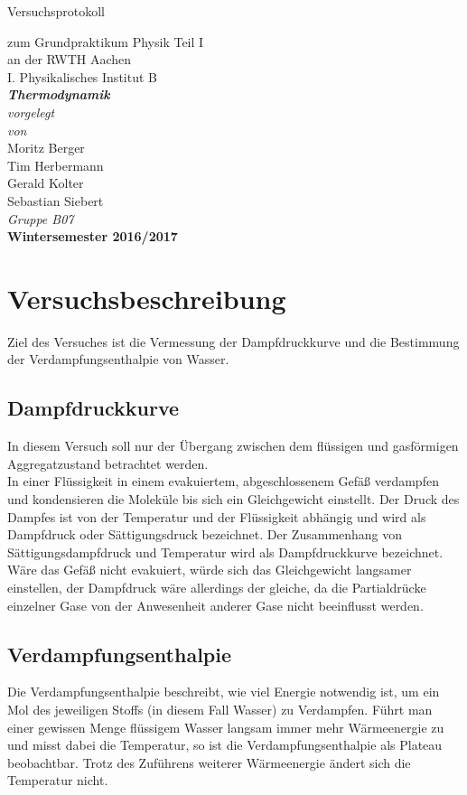\documentclass[12pt,a4paper]{article}
\author{Tim}
\begin{document}
\setlength{\parindent}{0pt} 
\begin{center}
{\LARGE Versuchsprotokoll}\\
\begin{large}
zum Grundpraktikum Physik Teil I\\[0.4cm]
an der RWTH Aachen\\
I. Physikalisches Institut B\\[4.5cm]
\Large\textbf{\textsl{Thermodynamik}}\\[4cm]
\normalsize\textit{vorgelegt\\von}\\[0.4cm]
\large{Moritz Berger\\Tim Herbermann\\Gerald Kolter\\Sebastian Siebert}\\[1cm]
\large \textit{Gruppe B07} \\ [3cm]
\large \textbf{Wintersemester 2016/2017}
\end{large}
\end{center}
\newpage
\tableofcontents
\newpage

\section{Versuchsbeschreibung}
Ziel des Versuches ist die Vermessung der Dampfdruckkurve und die Bestimmung der Verdampfungsenthalpie von Wasser.\\

\subsection{Dampfdruckkurve}
In diesem Versuch soll nur der Übergang zwischen dem flüssigen und gasförmigen Aggregatzustand betrachtet werden. \\
In einer Flüssigkeit in einem evakuiertem, abgeschlossenem Gefäß verdampfen und kondensieren die Moleküle bis sich ein Gleichgewicht einstellt. Der Druck des Dampfes ist von der Temperatur und der Flüssigkeit abhängig und wird als Dampfdruck oder Sättigungsdruck bezeichnet. Der Zusammenhang von Sättigungsdampfdruck und Temperatur wird als Dampfdruckkurve bezeichnet. Wäre das Gefäß nicht evakuiert, würde sich das Gleichgewicht langsamer einstellen, der Dampfdruck wäre allerdings der gleiche, da die Partialdrücke einzelner Gase von der Anwesenheit anderer Gase nicht beeinflusst werden.

\subsection{Verdampfungsenthalpie}
Die Verdampfungsenthalpie beschreibt, wie viel Energie notwendig ist, um ein Mol des jeweiligen Stoffs (in diesem Fall Wasser) zu Verdampfen. Führt man einer gewissen Menge flüssigem Wasser langsam immer mehr Wärmeenergie zu und misst dabei die Temperatur, so ist die Verdampfungsenthalpie als Plateau beobachtbar. Trotz des Zuführens weiterer Wärmeenergie ändert sich die Temperatur nicht. \\
\end{document}
